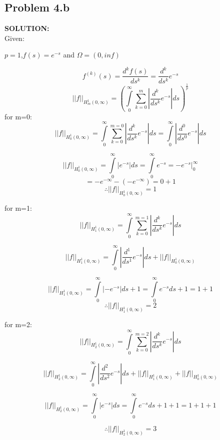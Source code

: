 \documentclass[10pt,a4paper]{article}
\begin{document}
\subsection{Problem 4.b}
\begin{tcolorbox}
\textbf{SOLUTION:}\\
Given:
\begin{center}
$p=1$,$f(s)=e^{-s}$ and $\Omega = (0, inf)$\\
\end{center}
$$f^{(k)}(s)=\frac{d^k f(s)}{ds^k}=\frac{d^k}{ds^k}e^{-s}$$
$$||f||_{H_{m}^1(0,\infty)}
=(\int\limits_0^\infty \sum\limits_{k=0}^{m}|\frac{d^k}{ds^k}e^{-s}| ds)^{\frac{1}{p}}$$
for m=0:
$$||f||_{H_{0}^1(0,\infty)}
=\int\limits_0^\infty \sum\limits_{k=0}^{m=0}|\frac{d^k}{ds^k}e^{-s}| ds
=\int\limits_0^\infty|\frac{d^0}{ds^0}e^{-s}| ds$$

$$||f||_{H_{0}^1(0,\infty)}
=\int\limits_0^\infty|e^{-s}| ds=\int\limits_0^\infty e^{-s}= -e^{-s} \big|_{0}^\infty$$
$$= -e^{-\infty} - ( -e^{-\infty}) = 0+1$$
$$\therefore ||f||_{H_{0}^1(0,\infty)} = 1$$


for m=1:
$$||f||_{H_{1}^1(0,\infty)}
=\int\limits_0^\infty \sum\limits_{k=0}^{m=1}|\frac{d^k}{ds^k}e^{-s}| ds$$

$$||f||_{H_{1}^1(0,\infty)}
=\int\limits_0^\infty|\frac{d^1}{ds^1}e^{-s}| ds
+||f||_{H_{0}^1(0,\infty)}$$

$$||f||_{H_{1}^1(0,\infty)}
=\int\limits_0^\infty|-e^{-s}|ds+1 
=\int\limits_0^\infty e^{-s}ds+1=1+1$$
$$\therefore ||f||_{H_{1}^1(0,\infty)}=2$$

for m=2:
$$||f||_{H_{2}^1(0,\infty)}
=\int\limits_0^\infty \sum\limits_{k=0}^{m=2}|\frac{d^k}{ds^k}e^{-s}| ds$$

$$||f||_{H_{2}^1(0,\infty)}
=\int\limits_0^\infty|\frac{d^2}{ds^2}e^{-s}| ds
+||f||_{H_{1}^1(0,\infty)}+||f||_{H_{0}^1(0,\infty)}$$

$$||f||_{H_{2}^1(0,\infty)}
=\int\limits_0^\infty|e^{-s}|ds
=\int\limits_0^\infty e^{-s}ds+1+1=1+1+1$$

$$\therefore ||f||_{H_{2}^1(0,\infty)}=3$$

\end{tcolorbox}
\end{document}
